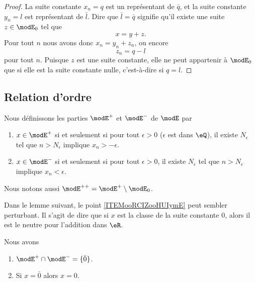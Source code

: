 \begin{proof}
	La suite constante \( x_n=q\) est un représentant de \( \bar q\), et la suite constante \( y_n=l\) est représentant de \( \bar l\). Dire que \( \bar l=\bar q\) signifie qu'il existe une suite \( z\in \modE_0\) tel que
	\begin{equation}
		x=y+z.
	\end{equation}
	Pour tout \( n\) nous avons donc \( x_n=y_n+z_n\), ou encore
	\begin{equation}
		z_n=q-l
	\end{equation}
	pour tout \( n\). Puisque \( z\) est une suite constante, elle ne peut appartenir à \( \modE_0\) que si elle est la suite constante nulle, c'est-à-dire si \( q=l\).
\end{proof}

\subsection{Relation d'ordre}

\begin{definition}
	Nous définissons les parties \( \modE^+\) et \( \modE^-\) de \( \modE\) par
	\begin{enumerate}
		\item
		      \( x\in  \modE^+\) si et seulement si pour tout \( \epsilon>0\) (\( \epsilon\) est dans \( \eQ\)), il existe \( N_{\epsilon}\) tel que \( n>N_{\epsilon}\) implique \( x_n>-\epsilon\).
		\item
		      \( x\in  \modE^-\) si et seulement si pour tout \( \epsilon>0\), il existe \( N_{\epsilon}\) tel que \( n>N_{\epsilon}\) implique \( x_n<\epsilon\).
	\end{enumerate}
	Nous notons aussi \( \modE^{++}=\modE^+\setminus\modE_0\).
\end{definition}


Dans le lemme suivant, le point \ref{ITEMooRCIZooHUIymE} peut sembler perturbant. Il s'agit de dire que si \( x\) est la classe de la suite constante \( 0\), alors il est le neutre pour l'addition dans \( \eR\).
\begin{lemma}       \label{LEMooJOYQooCDlhHW}
	Nous avons
	\begin{enumerate}
		\item   \label{ITEMooKRBYooZGhhch}
		      \( \modE^+\cap\modE^-=\{ \bar 0 \}\).
		\item       \label{ITEMooRCIZooHUIymE}
		      Si \( x=\bar 0\) alors \( x=0\).
	\end{enumerate}
\end{lemma}

